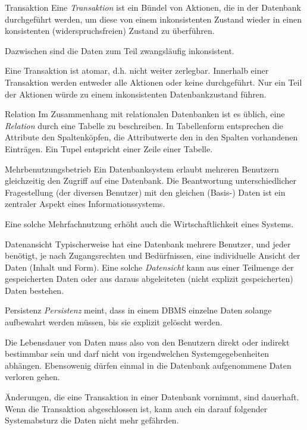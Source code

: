 \begin{defi}{Transaktion}
    Eine \emph{Transaktion} ist ein Bündel von Aktionen, die in der Datenbank durchgeführt werden, um diese von einem inkonsistenten Zustand wieder in einen konsistenten (widerspruchsfreien) Zustand zu überführen.

    Dazwischen sind die Daten zum Teil zwangsläufig inkonsistent.

    Eine Transaktion ist atomar, d.h. nicht weiter zerlegbar.
    Innerhalb einer Transaktion werden entweder alle Aktionen oder keine durchgeführt.
    Nur ein Teil der Aktionen würde zu einem inkonsistenten Datenbankzustand führen.
\end{defi}

\begin{defi}{Relation}
    Im Zusammenhang mit relationalen Datenbanken ist es üblich, eine \emph{Relation} durch eine Tabelle zu beschreiben.
    In Tabellenform entsprechen die Attribute den Spaltenköpfen, die Attributwerte den in den Spalten vorhandenen Einträgen.
    Ein Tupel entspricht einer Zeile einer Tabelle.
\end{defi}

\begin{defi}{Mehrbenutzungsbetrieb}
    Ein Datenbanksystem erlaubt mehreren Benutzern gleichzeitig den Zugriff auf eine Datenbank.
    Die Beantwortung unterschiedlicher Fragestellung (der diversen Benutzer) mit den gleichen (Basis-) Daten ist ein zentraler Aspekt eines Informationssystems.

    Eine solche Mehrfachnutzung erhöht auch die Wirtschaftlichkeit eines Systems.
\end{defi}

\begin{defi}{Datenansicht}
    Typischerweise hat eine Datenbank mehrere Benutzer, und jeder benötigt, je nach Zugangsrechten und Bedürfnissen, eine individuelle Ansicht der Daten (Inhalt und Form).
    Eine solche \emph{Datensicht} kann aus einer Teilmenge der gespeicherten Daten oder aus daraus abgeleiteten (nicht explizit gespeicherten) Daten bestehen.
\end{defi}

\begin{defi}{Persistenz}
    \emph{Persistenz} meint, dass in einem DBMS einzelne Daten solange aufbewahrt werden müssen, bis sie explizit gelöscht werden.

    Die Lebensdauer von Daten muss also von den Benutzern direkt oder indirekt bestimmbar sein und darf nicht von irgendwelchen Systemgegebenheiten abhängen.
    Ebensowenig dürfen einmal in die Datenbank aufgenommene Daten verloren gehen.

    Änderungen, die eine Transaktion in einer Datenbank vornimmt, sind dauerhaft. Wenn die Transaktion abgeschlossen ist, kann auch ein darauf folgender Systemabsturz die Daten nicht mehr gefährden.
\end{defi}

